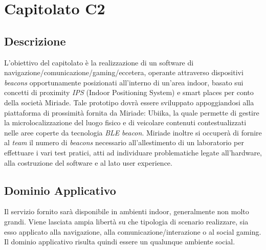 \newpage
\section{Capitolato C2}
\subsection{Descrizione}
L'obiettivo del capitolato è la realizzazione di un software di navigazione/comunicazione/gaming/eccetera, operante attraverso dispositivi \textit{beacons} opportunamente posizionati all'interno di un'area indoor, basato sui concetti di proximity \textit{IPS} (Indoor Positioning System) e smart places per conto della società Miriade. Tale prototipo dovrà essere sviluppato appoggiandosi alla piattaforma di prossimità fornita da Miriade: Ubiika, la quale permette di gestire la microlocalizzazione del luogo fisico e di veicolare contenuti contestualizzati nelle aree coperte da tecnologia \textit{BLE} \textit{beacon}. Miriade inoltre si occuperà di fornire al \textit{team} il numero di \textit{beacons} necessario all'allestimento di un laboratorio per effettuare i vari test pratici, atti ad individuare problematiche legate all'hardware, alla costruzione del software e al lato user experience.

\subsection{Dominio Applicativo}
Il servizio fornito sarà disponibile in ambienti indoor, generalmente non molto grandi. Viene lasciata ampia libertà su che tipologia di scenario realizzare, sia esso applicato alla navigazione, alla comunicazione/interazione o al social gaming. Il dominio applicativo risulta quindi essere un qualunque ambiente social.

